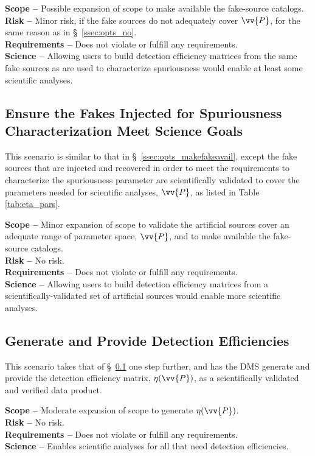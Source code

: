 {\bf Scope --} Possible expansion of scope to make available the fake-source catalogs. \\
{\bf Risk --} Minor risk, if the fake sources do not adequately cover $\vv{P}$, for the same reason as in \S~\ref{ssec:opts_no}. \\
{\bf Requirements --} Does not violate or fulfill any requirements. \\
{\bf Science --} Allowing users to build detection efficiency matrices from the same fake sources as are used to characterize spuriousness would enable at least some scientific analyses.

\subsection{Ensure the Fakes Injected for Spuriousness Characterization Meet Science Goals}\label{ssec:opts_ensurefakeP}

This scenario is similar to that in \S~\ref{ssec:opts_makefakeavail}, except the fake sources that are injected and recovered in order to meet the requirements to characterize the spuriousness parameter are scientifically validated to cover the parameters needed for scientific analyses, $\vv{P}$, as listed in Table \ref{tab:eta_pars}.

{\bf Scope --} Minor expansion of scope to validate the artificial sources cover an adequate range of parameter space, $\vv{P}$, and to make available the fake-source catalogs. \\
{\bf Risk --} No risk. \\
{\bf Requirements --} Does not violate or fulfill any requirements. \\
{\bf Science --} Allowing users to build detection efficiency matrices from a scientifically-validated set of artificial sources would enable more scientific analyses.

\subsection{Generate and Provide Detection Efficiencies}\label{ssec:opts_deteffs}

This scenario takes that of \S~\ref{ssec:opts_ensurefakeP} one step further, and has the DMS generate and provide the detection efficiency matrix, $\eta(\vv{P})$, as a scientifically validated and verified data product.

{\bf Scope --} Moderate expansion of scope to generate $\eta(\vv{P})$. \\
{\bf Risk --} No risk. \\
{\bf Requirements --} Does not violate or fulfill any requirements. \\
{\bf Science --} Enables scientific analyses for all that need detection efficiencies.


